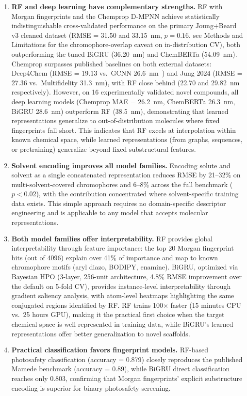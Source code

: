 \documentclass[journal=jcisd8,manuscript=article]{achemso}
\begin{document}
\begin{enumerate}
 \item \textbf{RF and deep learning have complementary strengths.}
 RF with Morgan fingerprints and the Chemprop D-MPNN achieve statistically indistinguishable cross-validated performance on the primary Joung+Beard v3 cleaned dataset (RMSE = 31.50 and 33.15~nm, $p = 0.16$, see Methods and Limitations for the chromophore-overlap caveat on in-distribution CV), both outperforming the tuned BiGRU (36.20~nm) and ChemBERTa (54.09~nm). Chemprop surpasses published baselines on both external datasets: Deep4Chem (RMSE = 19.13 vs.\ GCNN 26.6~nm~\cite{joung2021deep}) and Jung 2024 (RMSE = 27.36 vs.\ Multifidelity 31.3~nm), with RF close behind (22.70 and 29.82~nm respectively).
 However, on 16 experimentally validated novel compounds, all deep learning models (Chemprop MAE = 26.2~nm, ChemBERTa 26.3~nm, BiGRU 28.6~nm) outperform RF (38.5~nm), demonstrating that learned representations generalize to out-of-distribution molecules where fixed fingerprints fall short.
 This indicates that RF excels at interpolation within known chemical space, while learned representations (from graphs, sequences, or pretraining) generalize beyond fixed substructural features.

 \item \textbf{Solvent encoding improves all model families.}
 Encoding solute and solvent as a single concatenated representation reduces RMSE by 21--32\% on multi-solvent-covered chromophores and 6--8\% across the full benchmark ($p < 0.02$), with the contribution concentrated where solvent-specific training data exists.
 This simple approach requires no domain-specific descriptor engineering and is applicable to any model that accepts molecular representations.

 \item \textbf{Both model families offer interpretability.}
 RF provides global interpretability through feature importance: the top 20 Morgan fingerprint bits (out of 4096) explain over 41\% of importance and map to known chromophore motifs (aryl diazo, BODIPY, enamine).
 BiGRU, optimized via Bayesian HPO (3-layer, 256-unit architecture, 4.8\% RMSE improvement over the default on 5-fold CV), provides instance-level interpretability through gradient saliency analysis, with atom-level heatmaps highlighting the same conjugated regions identified by RF.
 RF trains 100$\times$ faster (15 minutes CPU vs.\ 25 hours GPU), making it the practical first choice when the target chemical space is well-represented in training data, while BiGRU's learned representations offer better generalization to novel scaffolds.

 \item \textbf{Practical classification favors fingerprint models.}
 RF-based photosafety classification (accuracy = 0.879) closely reproduces the published Mamede benchmark (accuracy = 0.89), while BiGRU direct classification reaches only 0.803, confirming that Morgan fingerprints' explicit substructure encoding is superior for binary photosafety screening.
\end{enumerate}
\end{document}

